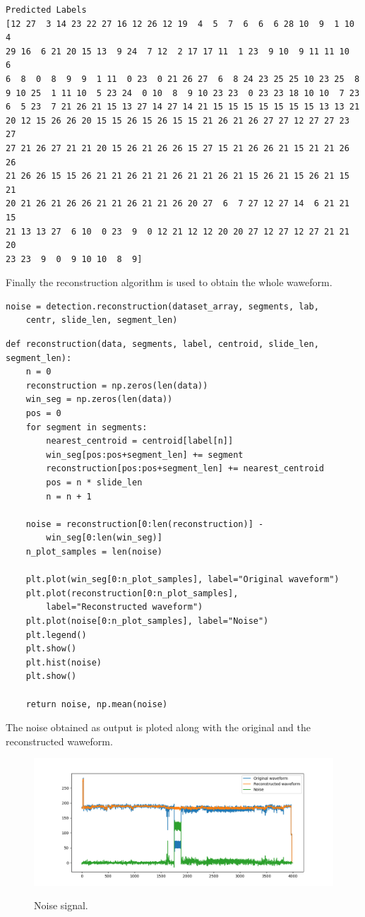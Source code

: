 \documentclass[12pt]{article}
\begin{document}
			\begin{lstlisting}
Predicted Labels
[12 27  3 14 23 22 27 16 12 26 12 19  4  5  7  6  6  6 28 10  9  1 10  4
29 16  6 21 20 15 13  9 24  7 12  2 17 17 11  1 23  9 10  9 11 11 10  6
6  8  0  8  9  9  1 11  0 23  0 21 26 27  6  8 24 23 25 25 10 23 25  8
9 10 25  1 11 10  5 23 24  0 10  8  9 10 23 23  0 23 23 18 10 10  7 23
6  5 23  7 21 26 21 15 13 27 14 27 14 21 15 15 15 15 15 15 15 13 13 21
20 12 15 26 26 20 15 15 26 15 26 15 15 21 26 21 26 27 27 12 27 27 23 27
27 21 26 27 21 21 20 15 26 21 26 26 15 27 15 21 26 26 21 15 21 21 26 26
21 26 26 15 15 26 21 21 26 21 21 26 21 21 26 21 15 26 21 15 26 21 15 21
20 21 26 21 26 26 21 21 26 21 21 26 20 27  6  7 27 12 27 14  6 21 21 15
21 13 13 27  6 10  0 23  9  0 12 21 12 12 20 20 27 12 27 12 27 21 21 20
23 23  9  0  9 10 10  8  9]
			\end{lstlisting}
			
			Finally the reconstruction algorithm is used to obtain the whole waweform. 
		
			\begin{lstlisting}
noise = detection.reconstruction(dataset_array, segments, lab, 
	centr, slide_len, segment_len)
			\end{lstlisting}
				
			\begin{lstlisting}
def reconstruction(data, segments, label, centroid, slide_len, segment_len):
	n = 0
	reconstruction = np.zeros(len(data)) 
	win_seg = np.zeros(len(data)) 
	pos = 0
	for segment in segments:
		nearest_centroid = centroid[label[n]]
		win_seg[pos:pos+segment_len] += segment
		reconstruction[pos:pos+segment_len] += nearest_centroid
		pos = n * slide_len
		n = n + 1

	noise = reconstruction[0:len(reconstruction)] -
		win_seg[0:len(win_seg)]
	n_plot_samples = len(noise)

	plt.plot(win_seg[0:n_plot_samples], label="Original waveform")
	plt.plot(reconstruction[0:n_plot_samples], 
		label="Reconstructed waveform")
	plt.plot(noise[0:n_plot_samples], label="Noise")
	plt.legend()
	plt.show()
	plt.hist(noise)
	plt.show()

	return noise, np.mean(noise)
			\end{lstlisting}
		
			The noise obtained as output is ploted along with the original and the reconstructed waweform.
		
			\begin{figure}[h!]
				\centering
				\includegraphics[scale=0.550]{img/noise.png}
				\label{fig7}
				\caption{Noise signal.}
			\end{figure}
	\newpage	
\end{document}
